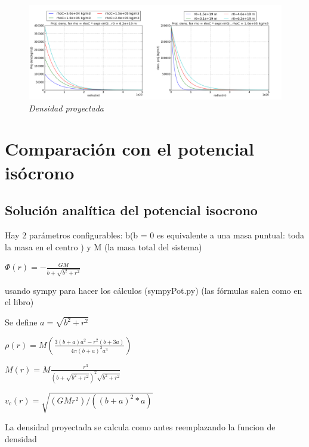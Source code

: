 \documentclass[12pt]{book}
\begin{document}
\begin{figure}[!ht]
 \centering
 \includegraphics[scale=0.33]{dpFinal.png}
 \caption{\emph{Densidad proyectada}}
\end{figure}

\clearpage

\section*{Comparación con el potencial isócrono}


\subsection*{Solución analítica del potencial isocrono}

\begin{description}
\item Hay 2 parámetros configurables: b(b = 0 es equivalente a una masa puntual: toda la masa en el centro )  y M (la masa total del sistema) 
 
\item $ \Phi(r) =  -\frac{G  M}  {b + \sqrt{b^2 + r^2}}  $
\item usando sympy para hacer los cálculos (sympyPot.py) (las fórmulas salen como en el libro)
\item  Se define  $a = \sqrt{b^2 + r^2}$
\item $ \rho(r) =  M  ( \frac{3(b+a)a^2 - r^2(b+3a) }{4 \pi (b+a)^3  a^3 })$		
\item $ M(r) = M\frac{r^3}{(b + \sqrt{b^2 + r^2})^2 \sqrt{b^2 + r^2}} $ 
\item $ v_c(r) =  \sqrt{(G  M  r ^ 2)/((b + a)^2 * a)} $ 
\item La densidad proyectada se calcula como antes reemplazando la funcion de densidad
\end{description}
\end{document}
